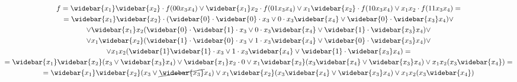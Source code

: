 \begin{multline*}
f=\widebar{x_1}\widebar{x_2} \cdot f(00 x_3 x_4) \lor \widebar{x_1}x_2 \cdot f(01 x_3 x_4) \lor x_1\widebar{x_2} \cdot f(10 x_3 x_4) \lor x_1x_2 \cdot f(11 x_3 x_4)=\\
=\widebar{x_1}\widebar{x_2} \cdot (\widebar{0} \cdot \widebar{0} \cdot x_3 \lor 0 \cdot x_3\widebar{x_4} \lor \widebar{0} \cdot \widebar{x_3}x_4) \lor \\ \lor \widebar{x_1}x_2(\widebar{0} \cdot \widebar{1} \cdot x_3 \lor 0 \cdot x_3\widebar{x_4} \lor \widebar{1} \cdot \widebar{x_3}x_4) \lor \\ \lor x_1\widebar{x_2}(\widebar{1} \cdot \widebar{0} \cdot x_3 \lor 1 \cdot x_3\widebar{x_4} \lor \widebar{0} \cdot \widebar{x_3}x_4) \lor \\ \lor x_1x_2(\widebar{1}\widebar{1} \cdot x_3 \lor 1 \cdot x_3\widebar{x_4} \lor \widebar{1} \cdot \widebar{x_3}x_4)=\\
=\widebar{x_1}\widebar{x_2}(x_3 \lor \widebar{x_3}x_4) \lor \widebar{x_1}x_2 \cdot 0 \lor x_1\widebar{x_2}(x_3\widebar{x_4} \lor \widebar{x_3}x_4) \lor x_1x_2(x_3\widebar{x_4})=\\
=\widebar{x_1}\widebar{x_2}(x_3 \lor \cancel{\widebar{x_3}}x_4) \lor x_1\widebar{x_2}(x_3\widebar{x_4} \lor \widebar{x_3}x_4) \lor x_1x_2(x_3\widebar{x_4})\\
\end{multline*}